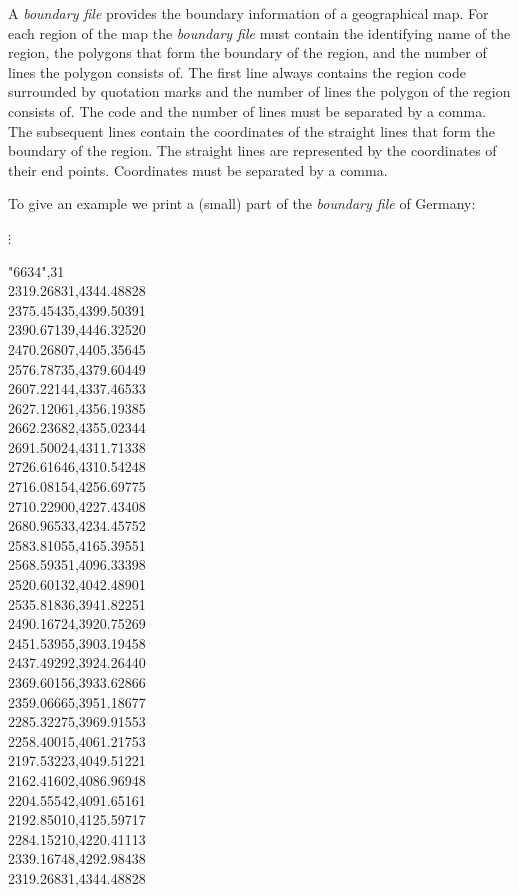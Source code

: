 A {\em boundary file} provides the boundary information of a
geographical map. For each region of the map the {\em boundary
file} must contain the identifying name of the region, the
polygons that form the boundary of the region, and the number of
lines the polygon consists of. The first line always contains the
region code surrounded by quotation marks and the number of lines
the polygon of the region consists of. The code and the number of
lines must be separated by a comma. The subsequent lines contain
the coordinates of the straight lines that form the boundary of
the region. The straight lines are represented by the coordinates
of their end points. Coordinates must be separated by a comma.

To give an example we print a (small) part of the {\em boundary
file} of Germany:


\footnotesize

\hspace{1cm}  $\vdots$

"6634",31 \\
2319.26831,4344.48828 \\
2375.45435,4399.50391 \\
2390.67139,4446.32520 \\
2470.26807,4405.35645 \\
2576.78735,4379.60449 \\
2607.22144,4337.46533 \\
2627.12061,4356.19385 \\
2662.23682,4355.02344 \\
2691.50024,4311.71338 \\
2726.61646,4310.54248 \\
2716.08154,4256.69775 \\
2710.22900,4227.43408 \\
2680.96533,4234.45752 \\
2583.81055,4165.39551 \\
2568.59351,4096.33398 \\
2520.60132,4042.48901 \\
2535.81836,3941.82251 \\
2490.16724,3920.75269 \\
2451.53955,3903.19458 \\
2437.49292,3924.26440 \\
2369.60156,3933.62866 \\
2359.06665,3951.18677 \\
2285.32275,3969.91553 \\
2258.40015,4061.21753 \\
2197.53223,4049.51221 \\
2162.41602,4086.96948 \\
2204.55542,4091.65161 \\
2192.85010,4125.59717 \\
2284.15210,4220.41113 \\
2339.16748,4292.98438 \\
2319.26831,4344.48828

